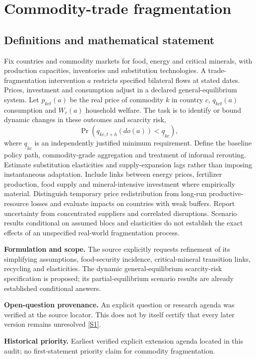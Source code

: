 \documentclass[11pt]{article}
\newcommand{\sref}[2]{\hyperlink{source:#1:#2}{[S#2]}}
\begin{document}
\section*{Commodity-trade fragmentation}\label{30007630}
\subsection{Definitions and mathematical statement}
Fix countries and commodity markets for food, energy and critical minerals, with production capacities, inventories and substitution technologies. A trade-fragmentation intervention \(a\) restricts specified bilateral flows at stated dates. Prices, investment and consumption adjust in a declared general-equilibrium system. Let \(p_{kct}(a)\) be the real price of commodity \(k\) in country \(c\), \(q_{kct}(a)\) consumption and \(W_c(a)\) household welfare. The task is to identify or bound dynamic changes in these outcomes and scarcity risk,
\[\Pr(q_{kc,t+h}(do(a))<\underline q_{kc}),\]
where \(\underline q_{kc}\) is an independently justified minimum requirement. Define the baseline policy path, commodity-grade aggregation and treatment of informal rerouting. Estimate substitution elasticities and supply-expansion lags rather than imposing instantaneous adaptation. Include links between energy prices, fertilizer production, food supply and mineral-intensive investment where empirically material. Distinguish temporary price redistribution from long-run productive-resource losses and evaluate impacts on countries with weak buffers. Report uncertainty from concentrated suppliers and correlated disruptions. Scenario results conditional on assumed blocs and elasticities do not establish the exact effects of an unspecified real-world fragmentation process.

\par\textbf{Formulation and scope.} The source explicitly requests refinement of its simplifying assumptions, food-security incidence, critical-mineral transition links, recycling and elasticities. The dynamic general-equilibrium scarcity-risk specification is proposed; its partial-equilibrium scenario results are already established conditional answers.

\par\textbf{Open-question provenance.} An explicit question or research agenda was verified at the source locator. This does not by itself certify that every later version remains unresolved \sref{30007630}{1}.

\par\textbf{Historical priority.} Earliest verified explicit extension agenda located in this audit; no first-statement priority claim for commodity fragmentation.
\end{document}
